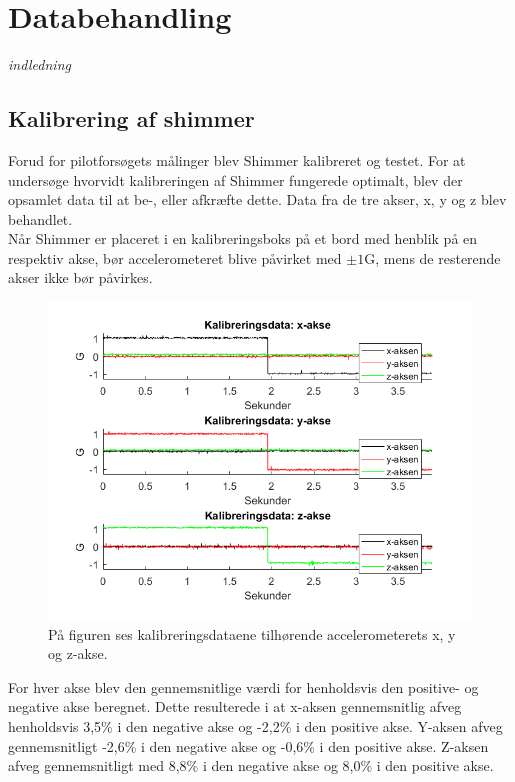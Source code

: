 \section{Databehandling}
\textit{indledning}


\subsection{Kalibrering af shimmer}
Forud for pilotforsøgets målinger blev Shimmer kalibreret og testet. For at undersøge hvorvidt kalibreringen af Shimmer fungerede optimalt, blev der opsamlet data til at be-, eller afkræfte dette. Data fra de tre akser, x, y og z blev behandlet. \\
Når Shimmer er placeret i en kalibreringsboks på et bord med henblik på en respektiv akse, bør accelerometeret blive påvirket med $\pm 1$G, mens de resterende akser ikke bør påvirkes.

\begin{figure}[H]
	\centering
	\includegraphics[scale=0.55]{figures/qBilag/kalibreringsdata}
	\caption{På figuren ses kalibreringsdataene tilhørende accelerometerets x, y og z-akse.}
	\label{fig:Ap_Kalibrering}
\end{figure}

For hver akse blev den gennemsnitlige værdi for henholdsvis den positive- og negative akse beregnet. Dette resulterede i at x-aksen gennemsnitlig afveg henholdsvis 3,5\% i den negative akse og -2,2\% i den positive akse. Y-aksen afveg gennemsnitligt -2,6\% i den negative akse og -0,6\% i den positive akse. Z-aksen afveg  gennemsnitligt med 8,8\% i den negative akse og 8,0\% i den positive akse.

